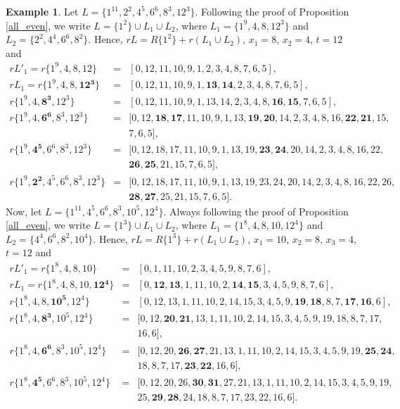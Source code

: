 \documentclass{amsart}
\theoremstyle{definition}
\newtheorem{ex}[prop]{Example}
\numberwithin{equation}{section}
\begin{document}
\begin{ex}
Let $L=\{1^{11}, 2^2, 4^5, 6^6, 8^3, 12^3\}$.
Following the proof of Proposition \ref{all_even}, we write $L=\{1^2\}\cup L_1 \cup L_2$,
where $L_1=\{1^{9}, 4, 8,  12^3 \}$ and $L_2=\{2^2,4^4,6^6,8^2 \}$. Hence,
$rL=R\{1^2\}+r(L_1\cup L_2)$, $x_1=8$, $x_2=4$, $t=12$ and
$$\begin{array}{rcl}
rL'_1=r\{1^{9},4,8, 12\}  & = & [0, 12,11,10,9,  1,2,3,4,  8,7,6,5 ],\\
rL_1=r\{1^{9},4,8, \bm{12^3} \}  & = & [0, 12,11,10,9,  1,\bm{13}, \bm{14}, 2,3,4,  8,7,6,5 ],\\
r\{1^{9},4,\bm{8^3}, 12^3 \}  & = & [0, 12,11,10,9,  1, 13, 14,  2,3,4,  8,\bm{16}, \bm{15}, 7,6,5 ],\\
r\{1^{9},4, \bm{6^6}, 8^3, 12^3 \}  & = & [0, 12,\bm{18}, \bm{17}, 11,10,9,  1, 13, \bm{19}, \bm{20}, 14,  2,3,4,
8,16,\bm{22},\bm{21}, 15,\\
&&7,6,5 ],\\
r\{1^{9},\bm{4^5}, 6^6, 8^3, 12^3 \}  & = & [0, 12, 18, 17, 11,10,9,  1, 13, 19, \bm{23},\bm{24}, 20, 14,  2,3,4,
8,16,22, \\
&& \bm{26},\bm{25}, 21 , 15, 7,6,5 ],\\
r\{1^{9},\bm{2^2}, 4^5, 6^6, 8^3, 12^3 \}  & = & [0, 12, 18, 17, 11,10,9,  1, 13, 19, 23,24, 20, 14,  2,3,4,
8,16,22, 26,\\
&&\bm{28}, \bm{27}, 25, 21 , 15, 7,6,5 ].
\end{array}$$
Now, let $L=\{1^{11},  4^5, 6^6, 8^3, 10^5, 12^4\}$.
Always following the proof of Proposition \ref{all_even}, we write $L=\{1^3\}\cup L_1 \cup L_2$,
where $L_1=\{1^{8}, 4, 8, 10, 12^4 \}$ and $L_2=\{4^4,6^6,8^2,10^4 \}$. Hence,
$rL=R\{1^3\}+r(L_1\cup L_2)$, $x_1=10$, $x_2=8$, $x_3=4$, $t=12$ and
$$\begin{array}{rcl}
rL'_1=r\{1^{8},4,8, 10\}  & = & [0,1,  11,10, 2,3,4,5, 9,8,7,6 ],\\
rL_1=r\{1^{8},4,8, 10, \bm{12^4}\}  & = & [0,\bm{12}, \bm{13}, 1,  11,10, 2,\bm{14}, \bm{15}, 3,4,5, 9,8,7,6 ],\\
r\{1^{8},4,8, \bm{10^5}, 12^4\}  & = & [0,12, 13, 1,  11,10, 2,14, 15, 3,4,5, 9,\bm{19}, \bm{18}, 8,7,\bm{17}, \bm{16},
6 ],\\
r\{1^{8},4,\bm{8^3}, 10^5, 12^4\}  & = & [0,12, \bm{20}, \bm{21}, 13, 1,  11,10, 2,14, 15, 3,4,5, 9, 19, 18,
8,7,17,\\
&& 16,6 ],\\
r\{1^{8},4,\bm{6^6}, 8^3, 10^5, 12^4\}  & = & [0,12, 20, \bm{26}, \bm{27}, 21, 13, 1,  11,10, 2,14, 15, 3,4,5, 9,
19,\bm{25}, \bm{24},\\
&& 18, 8,7,17,\bm{23}, \bm{22}, 16,6 ],\\
r\{1^{8},\bm{4^5},6^6, 8^3, 10^5, 12^4\}  & = & [0,12, 20, 26,\bm{30}, \bm{31}, 27, 21, 13, 1,  11,10, 2,14, 15, 3,4,5,
9, 19,\\
&& 25, \bm{29}, \bm{28}, 24, 18, 8,7,17,23, 22, 16,6 ].
\end{array}$$
\end{ex}
\end{document}
